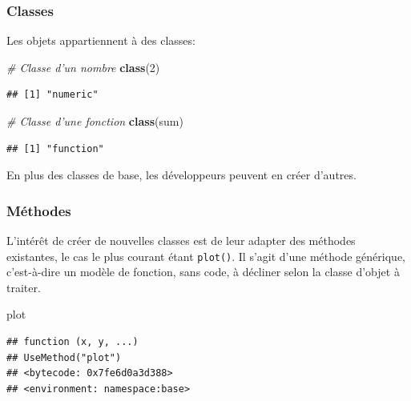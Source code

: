 \documentclass[
  12pt,
  french,
  a4paper,
  extrafontsizes,onecolumn,openright
  ]{memoir}
\newenvironment{Shaded}{\begin{snugshade}}{\end{snugshade}}
\newcommand{\CommentTok}[1]{\textcolor[rgb]{0.56,0.35,0.01}{\textit{#1}}}
\newcommand{\DecValTok}[1]{\textcolor[rgb]{0.00,0.00,0.81}{#1}}
\newcommand{\KeywordTok}[1]{\textcolor[rgb]{0.13,0.29,0.53}{\textbf{#1}}}
\newcommand{\NormalTok}[1]{#1}
\begin{document}
\hypertarget{classes}{%
\subsubsection{Classes}\label{classes}}

Les objets appartiennent à des classes:

\scriptsize

\begin{Shaded}
\begin{Highlighting}[]
\CommentTok{# Classe d'un nombre}
\KeywordTok{class}\NormalTok{(}\DecValTok{2}\NormalTok{)}
\end{Highlighting}
\end{Shaded}

\begin{verbatim}
## [1] "numeric"
\end{verbatim}

\begin{Shaded}
\begin{Highlighting}[]
\CommentTok{# Classe d'une fonction}
\KeywordTok{class}\NormalTok{(sum)}
\end{Highlighting}
\end{Shaded}

\begin{verbatim}
## [1] "function"
\end{verbatim}

\normalsize

En plus des classes de base, les développeurs peuvent en créer d'autres.

\hypertarget{muxe9thodes}{%
\subsubsection{Méthodes}\label{muxe9thodes}}

L'intérêt de créer de nouvelles classes est de leur adapter des méthodes existantes, le cas le plus courant étant \texttt{plot()}.
Il s'agit d'une méthode générique, c'est-à-dire un modèle de fonction, sans code, à décliner selon la classe d'objet à traiter.

\scriptsize

\begin{Shaded}
\begin{Highlighting}[]
\NormalTok{plot}
\end{Highlighting}
\end{Shaded}

\begin{verbatim}
## function (x, y, ...) 
## UseMethod("plot")
## <bytecode: 0x7fe6d0a3d388>
## <environment: namespace:base>
\end{verbatim}
\end{document}
